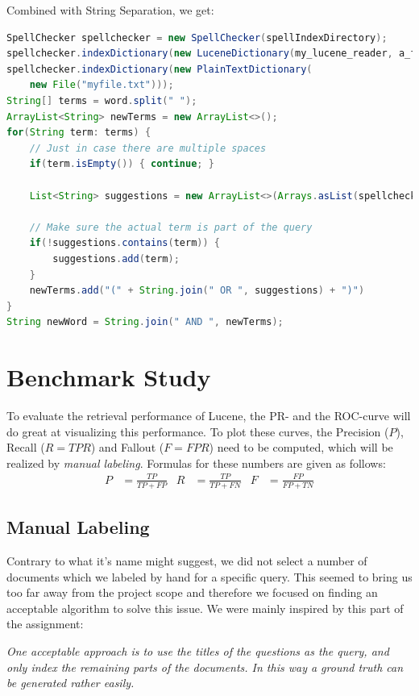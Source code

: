 \documentclass[11pt]{article}
\begin{document}
Combined with \textsf{String Separation}, we get:
\begin{lstlisting}[language=Java]
SpellChecker spellchecker = new SpellChecker(spellIndexDirectory);
spellchecker.indexDictionary(new LuceneDictionary(my_lucene_reader, a_field));
spellchecker.indexDictionary(new PlainTextDictionary(
    new File("myfile.txt")));
String[] terms = word.split(" ");
ArrayList<String> newTerms = new ArrayList<>();
for(String term: terms) {
    // Just in case there are multiple spaces
    if(term.isEmpty()) { continue; }
    
    List<String> suggestions = new ArrayList<>(Arrays.asList(spellchecker.suggestSimilar(term, 5));
    
    // Make sure the actual term is part of the query
    if(!suggestions.contains(term)) {
        suggestions.add(term);
    }
    newTerms.add("(" + String.join(" OR ", suggestions) + ")")
}
String newWord = String.join(" AND ", newTerms);
\end{lstlisting}

\section{Benchmark Study}\label{sec:bstudy}
To evaluate the retrieval performance of Lucene, the PR- and the ROC-curve will do great at visualizing this performance. To plot these curves, the Precision ($P$), Recall ($R = TPR$) and Fallout ($F = FPR$) need to be computed, which will be realized by \textit{manual labeling}. Formulas for these numbers are given as follows:
\begin{align*}
    P &= \frac{TP}{TP+FP}&
    R &= \frac{TP}{TP+FN}&
    F &= \frac{FP}{FP+TN}
\end{align*}

\subsection{Manual Labeling}
Contrary to what it's name might suggest, we did not select a number of documents which we labeled by hand for a specific query. This seemed to bring us too far away from the project scope and therefore we focused on finding an acceptable algorithm to solve this issue. We were mainly inspired by this part of the assignment:

\begin{displayquote}
    \textsl{One acceptable approach is to use the titles of the questions as the query, and only index the remaining parts of the documents. In this way a ground truth can be generated rather easily.}
\end{displayquote}
\end{document}
